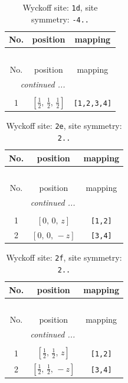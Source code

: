\documentclass[fleqn,8pt]{jsarticle}
\begin{document}
\renewcommand{\arraystretch}{1.2}
\begin{longtable}{ccc}
\caption{Wyckoff site: {\tt 1d}, site symmetry: {\tt -4..}}
 \\
 \hline \hline
No. & position & mapping \\ \hline \endfirsthead

\multicolumn{2}{l}{\tablename\ \thetable{}} \\
 \hline \hline
No. & position & mapping \\ \hline \endhead

 \hline \hline
\multicolumn{2}{r}{\footnotesize\it continued ...} \\ \endfoot

 \hline \hline
\multicolumn{2}{r}{} \\ \endlastfoot

1 & $\left[ \frac{1}{2},\, \frac{1}{2},\, \frac{1}{2} \right]$ & {\tt [1,2,3,4]} \\
\end{longtable}
\renewcommand{\arraystretch}{1.2}
\begin{longtable}{ccc}
\caption{Wyckoff site: {\tt 2e}, site symmetry: {\tt 2..}}
 \\
 \hline \hline
No. & position & mapping \\ \hline \endfirsthead

\multicolumn{2}{l}{\tablename\ \thetable{}} \\
 \hline \hline
No. & position & mapping \\ \hline \endhead

 \hline \hline
\multicolumn{2}{r}{\footnotesize\it continued ...} \\ \endfoot

 \hline \hline
\multicolumn{2}{r}{} \\ \endlastfoot

1 & $\left[ 0,\, 0,\, z \right]$ & {\tt [1,2]} \\ \hline
2 & $\left[ 0,\, 0,\, - z \right]$ & {\tt [3,4]} \\
\end{longtable}
\renewcommand{\arraystretch}{1.2}
\begin{longtable}{ccc}
\caption{Wyckoff site: {\tt 2f}, site symmetry: {\tt 2..}}
 \\
 \hline \hline
No. & position & mapping \\ \hline \endfirsthead

\multicolumn{2}{l}{\tablename\ \thetable{}} \\
 \hline \hline
No. & position & mapping \\ \hline \endhead

 \hline \hline
\multicolumn{2}{r}{\footnotesize\it continued ...} \\ \endfoot

 \hline \hline
\multicolumn{2}{r}{} \\ \endlastfoot

1 & $\left[ \frac{1}{2},\, \frac{1}{2},\, z \right]$ & {\tt [1,2]} \\ \hline
2 & $\left[ \frac{1}{2},\, \frac{1}{2},\, - z \right]$ & {\tt [3,4]} \\
\end{longtable}
\end{document}
